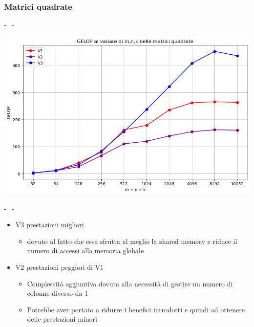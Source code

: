 \documentclass[compress]{beamer}
\begin{document}
\subsubsection*{Matrici quadrate}
\begin{frame}{\secname \text{ }- \subsecname\ \text{ }- \subsubsecname}
    \begin{minipage}{0.85\textwidth}
        \centering
        \begin{adjustbox}{margin=2cm 0cm 0cm 0cm, center} %
            \includegraphics[width=1.1\textwidth, frame]{resources/gpu_matrix_square.png}
        \end{adjustbox}
    \end{minipage}
    
\end{frame}
\begin{frame}{\secname \text{ }- \subsecname\ \text{ }- \subsubsecname}
    \begin{itemize}
        \item V3 prestazioni migliori
        \begin{itemize}
            \item dovuto al fatto che essa sfrutta al meglio la shared memory e riduce il numero di accessi alla memoria globale
        \end{itemize}
        \item V2 prestazioni peggiori di V1
        \begin{itemize}
            \item Complessità aggiuntiva dovuta alla necessità di gestire un numero di colonne diverso da 1
            \item Potrebbe aver portato a ridurre i benefici introdotti e quindi ad ottenere delle prestazioni minori
        \end{itemize}
    \end{itemize}
    
\end{frame}
\end{document}
